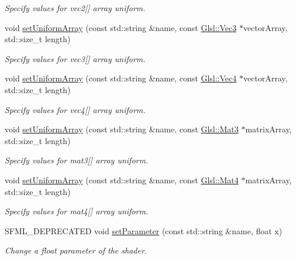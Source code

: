 \begin{DoxyCompactItemize}
\begin{DoxyCompactList}\small\item\em Specify values for {\ttfamily vec2}\mbox{[}\mbox{]} array uniform. \end{DoxyCompactList}\item 
void \hyperlink{classsf_1_1_shader_aeae884292fed977bbea5039818f208e7}{set\+Uniform\+Array} (const std\+::string \&name, const \hyperlink{namespacesf_1_1_glsl_a9bdd0463b7cb5316244a082007bd50f0}{Glsl\+::\+Vec3} $\ast$vector\+Array, std\+::size\+\_\+t length)
\begin{DoxyCompactList}\small\item\em Specify values for {\ttfamily vec3}\mbox{[}\mbox{]} array uniform. \end{DoxyCompactList}\item 
void \hyperlink{classsf_1_1_shader_aa89ac1ea7918c9b1c2232df59affb7fa}{set\+Uniform\+Array} (const std\+::string \&name, const \hyperlink{structsf_1_1priv_1_1_vector4}{Glsl\+::\+Vec4} $\ast$vector\+Array, std\+::size\+\_\+t length)
\begin{DoxyCompactList}\small\item\em Specify values for {\ttfamily vec4}\mbox{[}\mbox{]} array uniform. \end{DoxyCompactList}\item 
void \hyperlink{classsf_1_1_shader_a69587701d347ba21d506197d0fb9f842}{set\+Uniform\+Array} (const std\+::string \&name, const \hyperlink{structsf_1_1priv_1_1_matrix}{Glsl\+::\+Mat3} $\ast$matrix\+Array, std\+::size\+\_\+t length)
\begin{DoxyCompactList}\small\item\em Specify values for {\ttfamily mat3}\mbox{[}\mbox{]} array uniform. \end{DoxyCompactList}\item 
void \hyperlink{classsf_1_1_shader_a066b0ba02e1c1bddc9e2571eca1156ab}{set\+Uniform\+Array} (const std\+::string \&name, const \hyperlink{structsf_1_1priv_1_1_matrix}{Glsl\+::\+Mat4} $\ast$matrix\+Array, std\+::size\+\_\+t length)
\begin{DoxyCompactList}\small\item\em Specify values for {\ttfamily mat4}\mbox{[}\mbox{]} array uniform. \end{DoxyCompactList}\item 
S\+F\+M\+L\+\_\+\+D\+E\+P\+R\+E\+C\+A\+T\+ED void \hyperlink{classsf_1_1_shader_a4d6ec78f6de1a0a2146c93ab09d7d762}{set\+Parameter} (const std\+::string \&name, float x)
\begin{DoxyCompactList}\small\item\em Change a float parameter of the shader. \end{DoxyCompactList}\item 

\end{DoxyCompactItemize}
